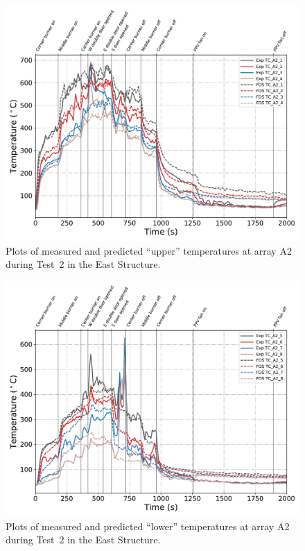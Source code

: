\clearpage 

\begin{figure}[!h]
	\centering
	\includegraphics[width=\columnwidth]{Figures/Plots/Validation/Temperature/Test_2_TC_A2_upper}
	\caption{Plots of measured and predicted ``upper'' temperatures at array A2 during Test~2 in the East Structure.}
	\label{fig:TCA2_upper_data_Test2}
\end{figure}

\begin{figure}[!h]
	\centering
	\includegraphics[width=\columnwidth]{Figures/Plots/Validation/Temperature/Test_2_TC_A2_lower}
	\caption{Plots of measured and predicted ``lower'' temperatures at array A2 during Test~2 in the East Structure.}
	\label{fig:TCA2_lower_data_Test2}
\end{figure}

